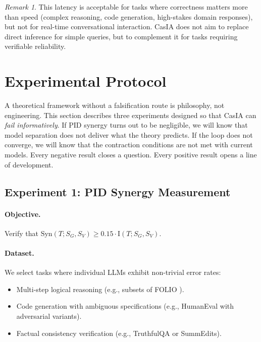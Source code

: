 \documentclass[11pt,a4paper]{article}
\theoremstyle{remark}
\newtheorem{remark}{Remark}[section]
\newcommand{\Syn}{\mathrm{Syn}}
\newcommand{\MI}{\mathrm{I}}
\begin{document}
\begin{remark}
This latency is acceptable for tasks where correctness matters more than speed (complex reasoning, code generation, high-stakes domain responses), but not for real-time conversational interaction. CasIA does not aim to replace direct inference for simple queries, but to complement it for tasks requiring verifiable reliability.
\end{remark}

\section{Experimental Protocol}
\label{sec:experiments}

A theoretical framework without a falsification route is philosophy, not engineering. This section describes three experiments designed so that CasIA can \emph{fail informatively}. If PID synergy turns out to be negligible, we will know that model separation does not deliver what the theory predicts. If the loop does not converge, we will know that the contraction conditions are not met with current models. Every negative result closes a question. Every positive result opens a line of development.

\subsection{Experiment 1: PID Synergy Measurement}

\paragraph{Objective.} Verify that $\Syn(T; S_G, S_V) \geq 0.15 \cdot \MI(T; S_G, S_V)$.

\paragraph{Dataset.} We select tasks where individual LLMs exhibit non-trivial error rates:
\begin{itemize}
  \item Multi-step logical reasoning (e.g., subsets of FOLIO \cite{han2022folio}).
  \item Code generation with ambiguous specifications (e.g., HumanEval with adversarial variants).
  \item Factual consistency verification (e.g., TruthfulQA \cite{lin2022truthfulqa} or SummEdits).
\end{itemize}
\end{document}
